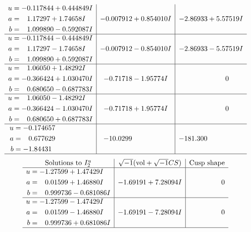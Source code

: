 \documentclass[1p]{elsarticle_modified}
\theoremstyle{definition}
\newcommand{\I}{\sqrt{-1}}
\begin{document}
$$\begin{array}{c|c|c}
\begin{aligned}
u &= -0.117844 + 0.444849 I \\
a &= \phantom{-}1.17297 + 1.74658 I \\
b &= \phantom{-}1.099890 - 0.592087 I\end{aligned}
 & -0.007912 + 0.854010 I & -2.86933 + 5.57519 I \\ \hline\begin{aligned}
u &= -0.117844 - 0.444849 I \\
a &= \phantom{-}1.17297 - 1.74658 I \\
b &= \phantom{-}1.099890 + 0.592087 I\end{aligned}
 & -0.007912 - 0.854010 I & -2.86933 - 5.57519 I \\ \hline\begin{aligned}
u &= \phantom{-}1.06050 + 1.48292 I \\
a &= -0.366424 + 1.030470 I \\
b &= \phantom{-}0.680650 - 0.687783 I\end{aligned}
 & -0.71718 - 1.95774 I & \phantom{-0.000000 } 0 \\ \hline\begin{aligned}
u &= \phantom{-}1.06050 - 1.48292 I \\
a &= -0.366424 - 1.030470 I \\
b &= \phantom{-}0.680650 + 0.687783 I\end{aligned}
 & -0.71718 + 1.95774 I & \phantom{-0.000000 } 0 \\ \hline\begin{aligned}
u &= -0.174657\phantom{ +0.000000I} \\
a &= \phantom{-}0.677629\phantom{ +0.000000I} \\
b &= -1.84431\phantom{ +0.000000I}\end{aligned}
 & -10.0299\phantom{ +0.000000I} & -181.300\phantom{ +0.000000I}\\
 \hline 
 \end{array}$$\newpage$$\begin{array}{c|c|c}  
\text{Solutions to }I^u_{2}& \I (\text{vol} + \sqrt{-1}CS) & \text{Cusp shape}\\
 \hline 
\begin{aligned}
u &= -1.27599 + 1.47429 I \\
a &= \phantom{-}0.01599 + 1.46880 I \\
b &= \phantom{-}0.999736 - 0.681086 I\end{aligned}
 & -1.69191 + 7.28094 I & \phantom{-0.000000 } 0 \\ \hline\begin{aligned}
u &= -1.27599 - 1.47429 I \\
a &= \phantom{-}0.01599 - 1.46880 I \\
b &= \phantom{-}0.999736 + 0.681086 I\end{aligned}
 & -1.69191 - 7.28094 I & \phantom{-0.000000 } 0\\
 \hline 
 \end{array}$$\newpage\newpage\renewcommand{\arraystretch}{1}
\end{document}
